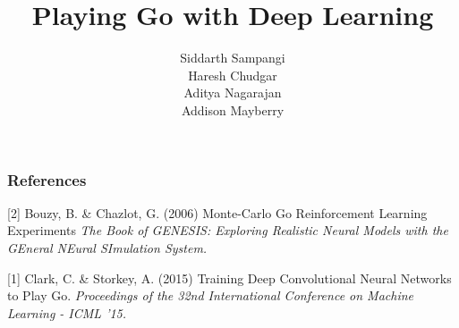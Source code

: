 \documentclass{article} %
\title{Playing Go with Deep Learning}
\author{
Siddarth Sampangi \\
\And
Haresh Chudgar \\
\AND
Aditya Nagarajan \\
\And
Addison Mayberry \\
}
\begin{document}
\maketitle









\subsubsection*{References}

\small{
[2] Bouzy, B. \& Chazlot, G. (2006) Monte-Carlo Go Reinforcement Learning Experiments {\it The Book of GENESIS: Exploring
Realistic Neural Models with the GEneral NEural SImulation System.}

[1] Clark, C. \& Storkey, A. (2015) Training Deep Convolutional Neural Networks to Play Go. {\it Proceedings of the 32nd International Conference on Machine Learning - ICML '15.}
}
\end{document}
